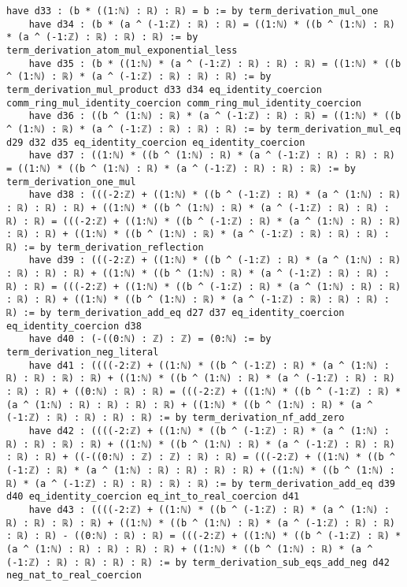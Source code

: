 \documentclass{article}
\begin{document}
\begin{tcolorbox}[colback=white!10, width=\linewidth]
\begin{lstlisting}[language=Lean4]
    have d33 : (b * ((1:ℕ) : ℝ) : ℝ) = b := by term_derivation_mul_one
    have d34 : (b * (a ^ (-1:ℤ) : ℝ) : ℝ) = ((1:ℕ) * ((b ^ (1:ℕ) : ℝ) * (a ^ (-1:ℤ) : ℝ) : ℝ) : ℝ) := by term_derivation_atom_mul_exponential_less
    have d35 : (b * ((1:ℕ) * (a ^ (-1:ℤ) : ℝ) : ℝ) : ℝ) = ((1:ℕ) * ((b ^ (1:ℕ) : ℝ) * (a ^ (-1:ℤ) : ℝ) : ℝ) : ℝ) := by term_derivation_mul_product d33 d34 eq_identity_coercion comm_ring_mul_identity_coercion comm_ring_mul_identity_coercion
    have d36 : ((b ^ (1:ℕ) : ℝ) * (a ^ (-1:ℤ) : ℝ) : ℝ) = ((1:ℕ) * ((b ^ (1:ℕ) : ℝ) * (a ^ (-1:ℤ) : ℝ) : ℝ) : ℝ) := by term_derivation_mul_eq d29 d32 d35 eq_identity_coercion eq_identity_coercion
    have d37 : ((1:ℕ) * ((b ^ (1:ℕ) : ℝ) * (a ^ (-1:ℤ) : ℝ) : ℝ) : ℝ) = ((1:ℕ) * ((b ^ (1:ℕ) : ℝ) * (a ^ (-1:ℤ) : ℝ) : ℝ) : ℝ) := by term_derivation_one_mul
    have d38 : (((-2:ℤ) + ((1:ℕ) * ((b ^ (-1:ℤ) : ℝ) * (a ^ (1:ℕ) : ℝ) : ℝ) : ℝ) : ℝ) + ((1:ℕ) * ((b ^ (1:ℕ) : ℝ) * (a ^ (-1:ℤ) : ℝ) : ℝ) : ℝ) : ℝ) = (((-2:ℤ) + ((1:ℕ) * ((b ^ (-1:ℤ) : ℝ) * (a ^ (1:ℕ) : ℝ) : ℝ) : ℝ) : ℝ) + ((1:ℕ) * ((b ^ (1:ℕ) : ℝ) * (a ^ (-1:ℤ) : ℝ) : ℝ) : ℝ) : ℝ) := by term_derivation_reflection
    have d39 : (((-2:ℤ) + ((1:ℕ) * ((b ^ (-1:ℤ) : ℝ) * (a ^ (1:ℕ) : ℝ) : ℝ) : ℝ) : ℝ) + ((1:ℕ) * ((b ^ (1:ℕ) : ℝ) * (a ^ (-1:ℤ) : ℝ) : ℝ) : ℝ) : ℝ) = (((-2:ℤ) + ((1:ℕ) * ((b ^ (-1:ℤ) : ℝ) * (a ^ (1:ℕ) : ℝ) : ℝ) : ℝ) : ℝ) + ((1:ℕ) * ((b ^ (1:ℕ) : ℝ) * (a ^ (-1:ℤ) : ℝ) : ℝ) : ℝ) : ℝ) := by term_derivation_add_eq d27 d37 eq_identity_coercion eq_identity_coercion d38
    have d40 : (-((0:ℕ) : ℤ) : ℤ) = (0:ℕ) := by term_derivation_neg_literal
    have d41 : ((((-2:ℤ) + ((1:ℕ) * ((b ^ (-1:ℤ) : ℝ) * (a ^ (1:ℕ) : ℝ) : ℝ) : ℝ) : ℝ) + ((1:ℕ) * ((b ^ (1:ℕ) : ℝ) * (a ^ (-1:ℤ) : ℝ) : ℝ) : ℝ) : ℝ) + ((0:ℕ) : ℝ) : ℝ) = (((-2:ℤ) + ((1:ℕ) * ((b ^ (-1:ℤ) : ℝ) * (a ^ (1:ℕ) : ℝ) : ℝ) : ℝ) : ℝ) + ((1:ℕ) * ((b ^ (1:ℕ) : ℝ) * (a ^ (-1:ℤ) : ℝ) : ℝ) : ℝ) : ℝ) := by term_derivation_nf_add_zero
    have d42 : ((((-2:ℤ) + ((1:ℕ) * ((b ^ (-1:ℤ) : ℝ) * (a ^ (1:ℕ) : ℝ) : ℝ) : ℝ) : ℝ) + ((1:ℕ) * ((b ^ (1:ℕ) : ℝ) * (a ^ (-1:ℤ) : ℝ) : ℝ) : ℝ) : ℝ) + ((-((0:ℕ) : ℤ) : ℤ) : ℝ) : ℝ) = (((-2:ℤ) + ((1:ℕ) * ((b ^ (-1:ℤ) : ℝ) * (a ^ (1:ℕ) : ℝ) : ℝ) : ℝ) : ℝ) + ((1:ℕ) * ((b ^ (1:ℕ) : ℝ) * (a ^ (-1:ℤ) : ℝ) : ℝ) : ℝ) : ℝ) := by term_derivation_add_eq d39 d40 eq_identity_coercion eq_int_to_real_coercion d41
    have d43 : ((((-2:ℤ) + ((1:ℕ) * ((b ^ (-1:ℤ) : ℝ) * (a ^ (1:ℕ) : ℝ) : ℝ) : ℝ) : ℝ) + ((1:ℕ) * ((b ^ (1:ℕ) : ℝ) * (a ^ (-1:ℤ) : ℝ) : ℝ) : ℝ) : ℝ) - ((0:ℕ) : ℝ) : ℝ) = (((-2:ℤ) + ((1:ℕ) * ((b ^ (-1:ℤ) : ℝ) * (a ^ (1:ℕ) : ℝ) : ℝ) : ℝ) : ℝ) + ((1:ℕ) * ((b ^ (1:ℕ) : ℝ) * (a ^ (-1:ℤ) : ℝ) : ℝ) : ℝ) : ℝ) := by term_derivation_sub_eqs_add_neg d42 neg_nat_to_real_coercion

\end{lstlisting}
\end{tcolorbox}
\end{document}
